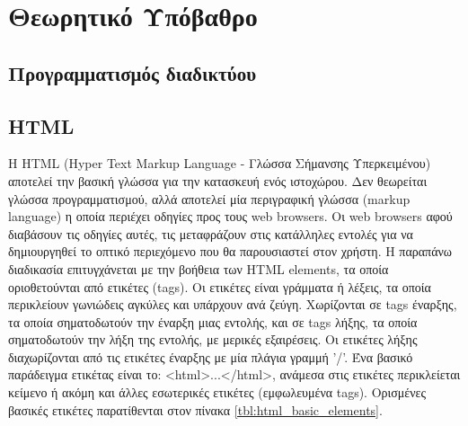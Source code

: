 \chapter{Θεωρητικό Υπόβαθρο}

\section{Προγραμματισμός διαδικτύου}

\section{HTML}
Η HTML (Hyper Text Markup Language - Γλώσσα Σήμανσης Υπερκειμένου) αποτελεί την βασική γλώσσα για την κατασκευή ενός ιστοχώρου. Δεν θεωρείται γλώσσα προγραμματισμού, αλλά αποτελεί μία περιγραφική γλώσσα (markup language) η οποία περιέχει οδηγίες προς τους web browsers. Οι web browsers αφού διαβάσουν τις οδηγίες αυτές, τις μεταφράζουν στις κατάλληλες εντολές για να δημιουργηθεί το οπτικό περιεχόμενο που θα παρουσιαστεί στον χρήστη. Η παραπάνω διαδικασία επιτυγχάνεται με την βοήθεια των HTML elements, τα οποία οριοθετούνται από ετικέτες (tags). Οι ετικέτες είναι γράμματα ή λέξεις, τα οποία περικλείουν γωνιώδεις αγκύλες και υπάρχουν ανά ζεύγη. Χωρίζονται σε tags έναρξης, τα οποία σηματοδωτούν την έναρξη μιας εντολής, και σε tags λήξης, τα οποία σηματοδωτούν την λήξη της εντολής, με μερικές εξαιρέσεις. Οι ετικέτες λήξης διαχωρίζονται από τις ετικέτες έναρξης με μία πλάγια γραμμή '/'. Ένα βασικό παράδειγμα ετικέτας είναι το: <html>...</html>, ανάμεσα στις ετικέτες περικλείεται κείμενο ή ακόμη και άλλες εσωτερικές ετικέτες (εμφωλευμένα tags). Ορισμένες βασικές ετικέτες παρατίθενται στον πίνακα \ref{tbl:html_basic_elements}.

